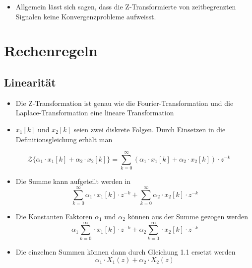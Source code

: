 \documentclass[11pt]{article}
\providecommand{\tightlist}{%
      \setlength{\itemsep}{0pt}\setlength{\parskip}{0pt}}
\begin{document}
\begin{itemize}
\tightlist
\item
  Allgemein lässt sich sagen, dass die Z-Transformierte von
  zeitbegrenzten Signalen keine Konvergenzprobleme aufweisst.
\end{itemize}

    \section{Rechenregeln}\label{rechenregeln}

\subsection{Linearität}\label{linearituxe4t}

\begin{itemize}
\item
  Die Z-Transformation ist genau wie die Fourier-Transformation und die
  Laplace-Transformation eine lineare Transformation
\item
  \(x_1[k]\) und \(x_2[k]\) seien zwei diskrete Folgen. Durch Einsetzen
  in die Definitionsgleichung erhält man
\end{itemize}

\[\mathcal{Z}\{\alpha_1 \cdot x_1[k] + \alpha_2 \cdot x_2[k]\} =  \sum_{k=0}^\infty (\alpha_1 \cdot x_1[k] + \alpha_2 \cdot x_2[k]) \cdot z^{-k}\]

    \begin{itemize}
\tightlist
\item
  Die Summe kann aufgeteilt werden in
  \[\sum_{k=0}^\infty \alpha_1 \cdot x_1[k] \cdot z^{-k} + \sum_{k=0}^\infty \alpha_2 \cdot x_2[k] \cdot z^{-k}\]
\end{itemize}

    \begin{itemize}
\tightlist
\item
  Die Konstanten Faktoren \(\alpha_1\) und \(\alpha_2\) können aus der
  Summe gezogen werden
  \[\alpha_1 \sum_{k=0}^\infty \cdot x_1[k] \cdot z^{-k} + \alpha_2 \sum_{k=0}^\infty \cdot x_2[k] \cdot z^{-k}\]
\end{itemize}

    \begin{itemize}
\tightlist
\item
  Die einzelnen Summen können dann durch Gleichung 1.1 ersetzt werden
  \[\alpha_1 \cdot X_1(z) + \alpha_2 \cdot X_2(z)\]
\end{itemize}
\end{document}
